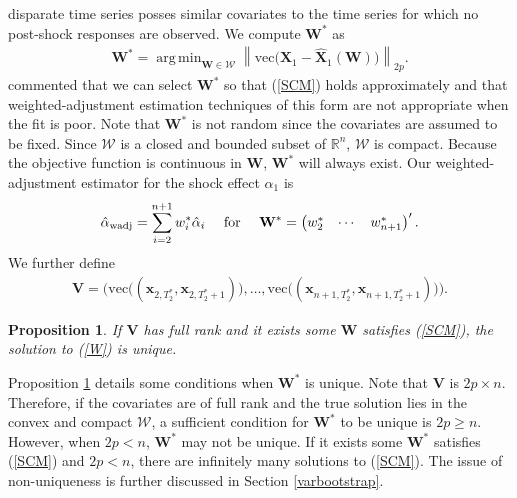 \documentclass[11pt]{article}
\def\mbf#1{\mathbf{#1}} %
\def\mrm#1{\mathrm{#1}} %
\newcommand{\reals}{\mathbb{R}} %
\def\mc#1{\mathcal{#1}} %
\DeclareMathOperator*{\argmin}{arg\,min} %
\newcommand{\norm}[1]{\left\lVert#1\right\rVert} %
\newtheorem{prop}{Proposition}
\theoremstyle{definition}
\begin{document}
disparate time series posses similar covariates to the time series for which 
no post-shock responses are observed. We compute $\mbf{W}^*$ as
\begin{align}
  \mbf{W}^* = \argmin_{\mbf{W}\in \mc{W}} \norm{\mrm{vec}\big(\mbf{X}_1-\hat{\mbf{X}}_1(\mbf{W})\big)}_{2p}. 
  \label{W}
\end{align}
\cite{abadie2010synthetic} commented that we can select $\mbf{W}^*$ 
so that (\ref{SCM}) holds approximately %
and that weighted-adjustment estimation techniques of this form are not 
appropriate when the fit is poor. 
Note that $\mbf{W}^*$ is not random since the covariates are assumed to be fixed. Since $\mc{W}$ is a closed and bounded subset of $\reals^n$,  $\mc{W}$ is compact. Because the objective function 
is continuous in $\mbf{W}$, $\mbf{W}^*$ will always exist. %
Our weighted-adjustment estimator for the shock effect $\alpha_1$ is
  \begin{align*}
    \hat{\alpha}_{\rm wadj} = \sum_{i=2}^{n+1} w_i^*\hat{\alpha}_i
    \quad \text{ for } \quad \mbf{W}^* = \begin{pmatrix}
      w^*_2 & \cdots & w^*_{n+1}
    \end{pmatrix}'.
  \end{align*}
 We further define
\begin{align*}
  \mathbf{V} = \Big(\mrm{vec}\big((\mathbf{x}_{2, T_2^*}, \mathbf{x}_{2, T_2^*+1})\big), \ldots, \mrm{vec}\big((\mathbf{x}_{n+1, T_2^*}, \mathbf{x}_{n+1, T_2^*+1})\big)\Big).
\end{align*}
\begin{prop}
  \label{uniqueness} If $\mathbf{V}$ has full rank and it exists some $\mathbf{W}$ satisfies (\ref{SCM}), the solution to  (\ref{W}) is unique.
\end{prop} 
Proposition \ref{uniqueness} details some conditions when $\mathbf{W}^*$ is unique.  Note that $\mathbf{V}$ is $2p \times n$. Therefore, if the covariates are of full rank and the true solution lies in the convex and compact $\mathcal{W}$, a sufficient condition for $\mathbf{W}^*$ to be unique is $2p \geq n$. However, when $2p < n$, $\mathbf{W}^*$ may not be unique. If it exists some $\mathbf{W}^*$ satisfies (\ref{SCM}) and $2p < n$, there are infinitely many solutions to (\ref{SCM}).  The issue of non-uniqueness is further discussed in Section \ref{varbootstrap}.
\end{document}
